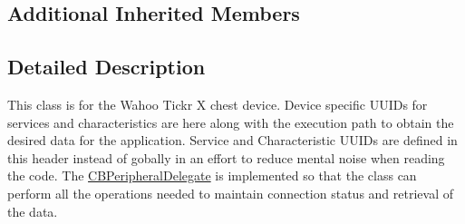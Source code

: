 \subsection*{Additional Inherited Members}


\subsection{Detailed Description}
This class is for the Wahoo Tickr X chest device. Device specific U\-U\-I\-Ds for services and characteristics are here along with the execution path to obtain the desired data for the application. Service and Characteristic U\-U\-I\-Ds are defined in this header instead of gobally in an effort to reduce mental noise when reading the code. The \hyperlink{class_c_b_peripheral_delegate-p}{C\-B\-Peripheral\-Delegate} is implemented so that the class can perform all the operations needed to maintain connection status and retrieval of the data. 

